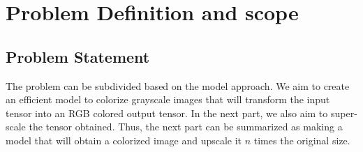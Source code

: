 \documentclass[oneside,a4paper,12pt]{report}
\begin{document}
\section{Problem Definition and scope}
\subsection{Problem Statement}
\hspace*{0.25 in}The problem can be subdivided based on the model approach. We aim to create an efficient model to colorize grayscale images that will transform the input tensor into an RGB colored output tensor. In the next part, we also aim to super-scale the tensor obtained. Thus, the next part can be summarized as making a model that will obtain a colorized image and upscale it $n$ times the original size.
\end{document}
